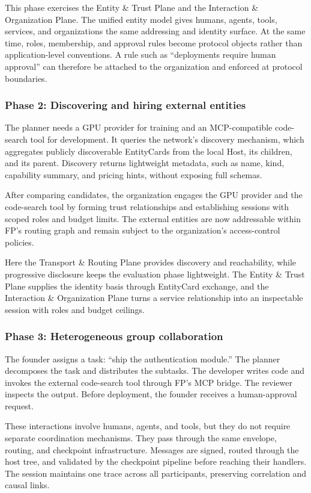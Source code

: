 This phase exercises the Entity \& Trust Plane and the Interaction \& Organization Plane. The unified entity model gives humans, agents, tools, services, and organizations the same addressing and identity surface. At the same time, roles, membership, and approval rules become protocol objects rather than application-level conventions. A rule such as ``deployments require human approval'' can therefore be attached to the organization and enforced at protocol boundaries.

\subsubsection{Phase 2: Discovering and hiring external entities}

The planner needs a GPU provider for training and an MCP-compatible code-search tool for development. It queries the network's discovery mechanism, which aggregates publicly discoverable EntityCards from the local Host, its children, and its parent. Discovery returns lightweight metadata, such as name, kind, capability summary, and pricing hints, without exposing full schemas.

After comparing candidates, the organization engages the GPU provider and the code-search tool by forming trust relationships and establishing sessions with scoped roles and budget limits. The external entities are now addressable within FP's routing graph and remain subject to the organization's access-control policies.

Here the Transport \& Routing Plane provides discovery and reachability, while progressive disclosure keeps the evaluation phase lightweight. The Entity \& Trust Plane supplies the identity basis through EntityCard exchange, and the Interaction \& Organization Plane turns a service relationship into an inspectable session with roles and budget ceilings.

\subsubsection{Phase 3: Heterogeneous group collaboration}

The founder assigns a task: ``ship the authentication module.'' The planner decomposes the task and distributes the subtasks. The developer writes code and invokes the external code-search tool through FP's MCP bridge. The reviewer inspects the output. Before deployment, the founder receives a human-approval request.

These interactions involve humans, agents, and tools, but they do not require separate coordination mechanisms. They pass through the same envelope, routing, and checkpoint infrastructure. Messages are signed, routed through the host tree, and validated by the checkpoint pipeline before reaching their handlers. The session maintains one trace across all participants, preserving correlation and causal links.

